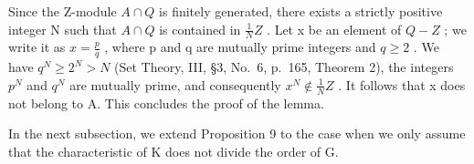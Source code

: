 Since the Z-module \(A \cap Q\) is finitely generated, there exists a strictly positive integer N such that \(A \cap Q\) is contained in \(\frac{1}{N}Z\) . Let x be an element of \(Q - Z\) ; we write it as \(x = \frac{p}{q}\) , where p and q are mutually prime integers and \(q \geqslant 2\) . We have \(q^{N} \geqslant 2^{N} > N\) (Set Theory, III, §3, No.~6, p.~165, Theorem 2), the integers \(p^{N}\) and \(q^{N}\) are mutually prime, and consequently \(x^{N} \notin \frac{1}{N}Z\) . It follows that x does not belong to A. This concludes the proof of the lemma.

In the next subsection, we extend Proposition 9 to the case when we only assume that the characteristic of K does not divide the order of G.


